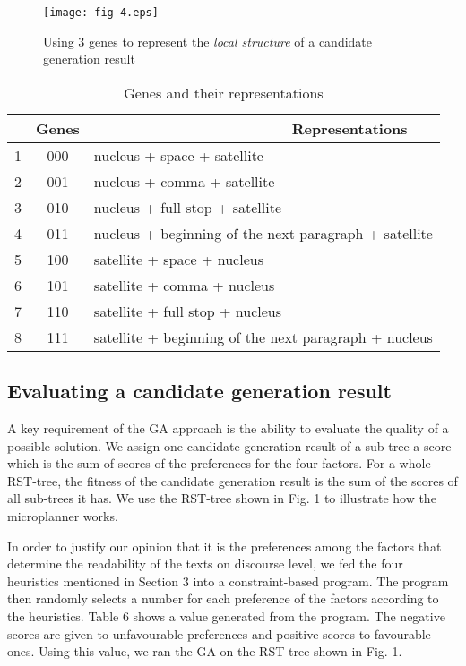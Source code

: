 \documentclass[english]{jnlp_1.2.0}
\begin{document}
\begin{figure}[t]
\texttt{[image: fig-4.eps]}
\caption{Using 3 genes to represent the \textit{local structure} of a candidate generation result}
\end{figure}

\begin{table}[t]
\caption{Genes and their representations}
\begin{center}
 \begin{tabular}{|c|c|l|}      \hline
    & Genes   &~~~~~~~~~~~~~~~~~~~~~~~~Representations  \\ \hline \hline
 1  & 000    &     nucleus + space + satellite   \\ \hline        
 2  & 001    &     nucleus + comma + satellite \\ \hline
 3  & 010    &     nucleus + full stop + satellite \\ \hline
 4  & 011    &     nucleus + beginning of the next paragraph + satellite \\ \hline
 5  & 100    &     satellite + space + nucleus \\ \hline
 6  & 101    &     satellite + comma + nucleus \\ \hline
 7  & 110    &     satellite + full stop + nucleus \\ \hline
 8  & 111    &     satellite + beginning of the next paragraph + nucleus \\ \hline
\end{tabular}
\end{center}
\end{table}


\subsection{Evaluating a candidate generation result}

A key requirement of the GA approach is the ability to evaluate the
quality of a possible solution. We assign one candidate generation 
result of a sub-tree a score which is the sum of scores of the 
preferences for the four factors. For a whole RST-tree, the fitness 
of the candidate generation result is the sum of the scores of all 
sub-trees it has. We use the RST-tree shown in Fig. 1 to illustrate 
how the microplanner works. 

In order to justify our opinion that it is the preferences among 
the factors that determine the readability of the texts on discourse 
level, we fed the four heuristics mentioned in Section 3 into a 
constraint-based program. The program then randomly selects 
a number for each preference of the factors according to the 
heuristics. Table 6 shows a value generated from the program. 
The negative scores are given to unfavourable preferences and 
positive scores to favourable ones. Using this value, we ran 
the GA on the RST-tree shown in Fig. 1. 
\end{document}
